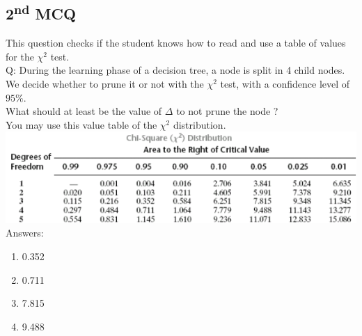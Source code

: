 \documentclass[a4paper, 10pt]{article}
\begin{document}
\subsection{2\textsuperscript{nd} MCQ}
This question checks if the student knows how to read and use a table of values for the $\chi^2$ test.
\\
Q: During the learning phase of a decision tree, a node is split in 4 child nodes. We decide 
whether to prune it or not with the $\chi^2$ test, with a confidence level of $95\%$.
\\
What should at least be the value of $\Delta$ to not prune the node ?
\\
You may use this value table of the $\chi^2$ distribution.
\\
\includegraphics[scale=0.75]{chi2}
\\
Answers:
\begin{enumerate}
    \item 0.352
    \item 0.711
    \item 7.815 \textdagger
    \item 9.488 


\end{enumerate}
\end{document}
